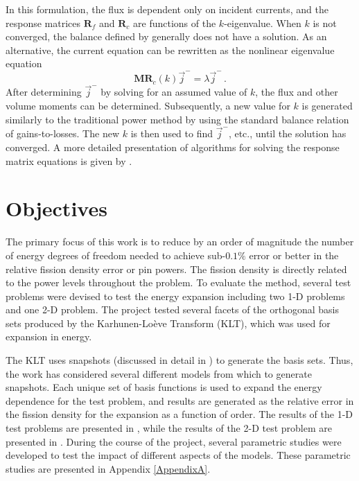 In this formulation, the flux is dependent only on incident currents, and 
the response matrices $\mathbf{R}_{f}$ and $\mathbf{R}_{c}$ are functions of 
the $k$-eigenvalue.  When $k$ is not converged, the balance defined by 
 generally does not have a solution. As an alternative, the 
current equation can be rewritten as the nonlinear eigenvalue equation
\begin{equation}
    \mathbf{MR}_{c}(k)   \vec{j}^- = \lambda \vec{j}^- \, .
    \label{eq:lambdaeig}
\end{equation}
After determining $\vec{j}^-$ by solving  
for an assumed value of $k$, the flux and other volume moments can be 
determined.  
Subsequently, a 
new value for $k$ is generated similarly to the traditional power method by 
using the standard balance relation of gains-to-losses.  The new $k$ is then 
used to find $\vec{j}^-$, etc., until the solution has converged. A more 
detailed presentation of algorithms for solving the response matrix equations 
is given by \citet{RobertsSerment}.


\section{Objectives}

The primary focus of this work is to reduce by an order of magnitude the number of 
energy degrees of freedom needed to achieve sub-$0.1\%$ 
error or better in the relative fission density error or pin powers. The 
fission density is 
directly related to the power levels throughout the problem.  To evaluate the method, 
several test problems were devised to test the energy expansion including two 
1-D problems and one 2-D problem.  The project tested several facets of the 
orthogonal basis sets produced by the Karhunen-Lo\`{e}ve Transform (KLT), which 
was used for expansion in energy.  

The KLT uses snapshots (discussed in detail in ) to 
generate the basis sets.  Thus, the work has considered several different 
models from which to generate snapshots.  Each unique set of basis functions is 
used to expand the energy dependence for the test problem, and results are 
generated as 
the relative error in the fission density for the expansion as a function of 
order.  The results of the 1-D test problems are presented in 
, while the results of the 2-D test problem are presented 
in 
.  During the course of the project, several parametric 
studies were developed to test the impact of different aspects of the models.  
These parametric studies are presented in Appendix \ref{AppendixA}.